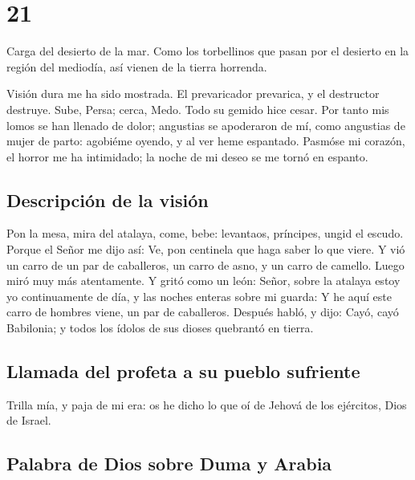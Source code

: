 \hypertarget{section-20}{%
\section{21}\label{section-20}}

 Carga del desierto de la mar. Como los torbellinos que
pasan por el desierto en la región del mediodía, así vienen de la tierra
horrenda.

 Visión dura me ha sido mostrada. El prevaricador prevarica,
y el destructor destruye. Sube, Persa; cerca, Medo. Todo su gemido hice
cesar.  Por tanto mis lomos se han llenado de dolor;
angustias se apoderaron de mí, como angustias de mujer de parto:
agobiéme oyendo, y al ver heme espantado.  Pasmóse mi
corazón, el horror me ha intimidado; la noche de mi deseo se me tornó en
espanto.

\hypertarget{descripciuxf3n-de-la-visiuxf3n}{%
\subsection{Descripción de la
visión}\label{descripciuxf3n-de-la-visiuxf3n}}

 Pon la mesa, mira del atalaya, come, bebe: levantaos,
príncipes, ungid el escudo.  Porque el Señor me dijo así:
Ve, pon centinela que haga saber lo que viere.  Y vió un
carro de un par de caballeros, un carro de asno, y un carro de camello.
Luego miró muy más atentamente.  Y gritó como un león:
Señor, sobre la atalaya estoy yo continuamente de día, y las noches
enteras sobre mi guarda:  Y he aquí este carro de hombres
viene, un par de caballeros. Después habló, y dijo: Cayó, cayó
Babilonia; y todos los ídolos de sus dioses quebrantó en tierra.

\hypertarget{llamada-del-profeta-a-su-pueblo-sufriente}{%
\subsection{Llamada del profeta a su pueblo
sufriente}\label{llamada-del-profeta-a-su-pueblo-sufriente}}

 Trilla mía, y paja de mi era: os he dicho lo que oí de
Jehová de los ejércitos, Dios de Israel.

\hypertarget{palabra-de-dios-sobre-duma-y-arabia}{%
\subsection{Palabra de Dios sobre Duma y
Arabia}\label{palabra-de-dios-sobre-duma-y-arabia}}

